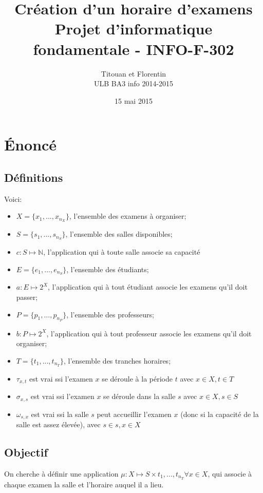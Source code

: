 \documentclass[a4paper]{article}
\title{
    Création d'un horaire d'examens\\
    \small Projet d'informatique fondamentale - INFO-F-302
}
\author{
    Titouan \bsc{Christophe} et Florentin \bsc{Hennecker}\\
    ULB BA3 info 2014-2015
}
\date{15 mai 2015}
\begin{document}
\maketitle
\tableofcontents

\section{\'Enonc\'e}
\subsection{Définitions}

Voici:
\begin{itemize}
  \item $X = \{x_1, ..., x_{n_X}\}$, l'ensemble des examens à organiser;
  \item $S = \{s_1, ..., s_{n_S}\}$, l'ensemble des salles disponibles;
  \item $c : S \mapsto \mathbb{N}$, l'application qui à toute salle associe sa capacité
  \item $E = \{e_1, ..., e_{n_S}\}$, l'ensemble des étudiants;
  \item $a : E \mapsto 2^X$, l'application qui à tout étudiant associe les examens qu'il doit passer;
  \item $P = \{p_1, ..., p_{n_P}\}$, l'ensemble des professeurs;
  \item $b : P \mapsto 2^X$, l'application qui à tout professeur associe les examens qu'il doit organiser;
  \item $T = \{t_1, ..., t_{n_T}\}$, l'ensemble des tranches horaires;
  \item $\tau_{x,t}$ est vrai ssi l'examen $x$ se déroule à la période $t$ avec $x \in X, t \in T$
  \item $\sigma_{x,s}$ est vrai ssi l'examen $x$ se déroule dans la salle $s$ avec $x \in X, s \in S$
  \item $\omega_{s,x}$ est vrai ssi la salle $s$ peut accueillir l'examen $x$ (donc si la capacité de la salle est assez élevée), avec $s \in s, x \in X$
\end{itemize}

\subsection{Objectif}
On cherche à définir une application $\mu : X \mapsto S \times {t_1, ..., t_{n_T}} \forall x \in X$,
qui associe à chaque examen la salle et l'horaire auquel il a lieu.
\end{document}
